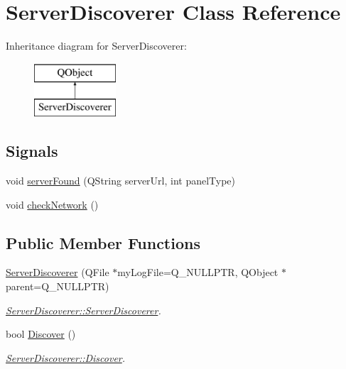 \hypertarget{classServerDiscoverer}{}\section{Server\+Discoverer Class Reference}
\label{classServerDiscoverer}
Inheritance diagram for Server\+Discoverer\+:\begin{figure}[H]
\begin{center}
\leavevmode
\includegraphics[height=2.000000cm]{d1/d4a/classServerDiscoverer}
\end{center}
\end{figure}
\subsection*{Signals}
\begin{DoxyCompactItemize}
\item 
void \mbox{\hyperlink{classServerDiscoverer_a7ee703cbd453780cce0d778f37cc5210}{server\+Found}} (Q\+String server\+Url, int panel\+Type)
\item 
void \mbox{\hyperlink{classServerDiscoverer_a2d1f3cada3f32eb84efa7c871d7c697a}{check\+Network}} ()
\end{DoxyCompactItemize}
\subsection*{Public Member Functions}
\begin{DoxyCompactItemize}
\item 
\mbox{\hyperlink{classServerDiscoverer_a2c2b628630dc1928302e02768baa4837}{Server\+Discoverer}} (Q\+File $\ast$my\+Log\+File=Q\+\_\+\+N\+U\+L\+L\+P\+TR, Q\+Object $\ast$parent=Q\+\_\+\+N\+U\+L\+L\+P\+TR)
\begin{DoxyCompactList}\small\item\em \mbox{\hyperlink{classServerDiscoverer_a2c2b628630dc1928302e02768baa4837}{Server\+Discoverer\+::\+Server\+Discoverer}}. \end{DoxyCompactList}\item 
bool \mbox{\hyperlink{classServerDiscoverer_ae1bf2c4219f5e7510ab970ac66542606}{Discover}} ()
\begin{DoxyCompactList}\small\item\em \mbox{\hyperlink{classServerDiscoverer_ae1bf2c4219f5e7510ab970ac66542606}{Server\+Discoverer\+::\+Discover}}. \end{DoxyCompactList}\end{DoxyCompactItemize}
